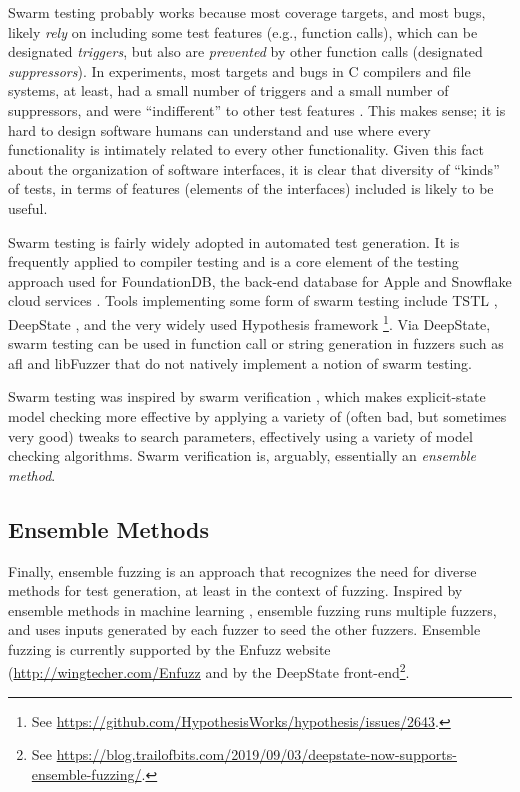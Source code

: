 \documentclass[sigplan,review]{acmart}
\begin{document}
Swarm testing probably works because most coverage targets, and most
bugs, likely \emph{rely} on including some test features (e.g.,
function calls), which can be designated \emph{triggers}, but also are
\emph{prevented} by other function calls (designated
\emph{suppressors}).  In experiments, most targets and bugs in C
compilers and file systems, at least, had a small number of triggers
and a small number of suppressors, and were ``indifferent'' to other
test features \cite{groce2013help}.  This makes sense; it is hard to
design software humans can understand and use where every
functionality is intimately related to every other functionality.
Given this fact about the organization of software interfaces, it is
clear that diversity of ``kinds'' of tests, in terms of features
(elements of the interfaces) included is likely to be useful.

Swarm testing is fairly widely adopted in automated test generation.  It is frequently
applied to compiler testing \cite{le2014compiler,dewey2015fuzzing} and
is a core element of the testing approach used for FoundationDB, the
back-end database for Apple and Snowflake cloud services
\cite{zhou2021foundationdb}.  Tools implementing some form of swarm
testing include TSTL \cite{tstlsttt}, DeepState \cite{goodman2018deepstate}, and the very widely used Hypothesis
framework \cite{hypothesis}\footnote{See \url{https://github.com/HypothesisWorks/hypothesis/issues/2643}.}.
Via DeepState, swarm testing can be used in function call or
string generation in fuzzers such as afl and libFuzzer that do not
natively implement a notion of swarm testing.

Swarm testing was inspired by swarm verification \cite{swarmIEEE},
which makes explicit-state model checking more effective by applying a
variety of (often bad, but sometimes very good) tweaks to search
parameters, effectively using a variety of model checking algorithms.
Swarm verification is, arguably, essentially an \emph{ensemble method}.

\subsection{Ensemble Methods}

Finally, ensemble fuzzing \cite{chen2019enfuzz} is an approach that recognizes the need for
diverse methods for test generation, at least in the context of
fuzzing.   Inspired by ensemble methods in machine learning \cite{dietterich2002ensemble},
ensemble fuzzing runs multiple fuzzers, and uses inputs generated by
each fuzzer to seed the other fuzzers.  Ensemble fuzzing is currently
supported by the Enfuzz website  (\url{http://wingtecher.com/Enfuzz}
and by the DeepState front-end\footnote{See
\url{https://blog.trailofbits.com/2019/09/03/deepstate-now-supports-ensemble-fuzzing/}.}.
\end{document}
